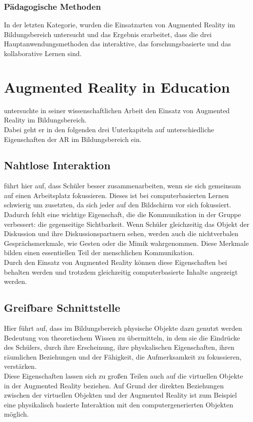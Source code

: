\subsubsection{Pädagogische Methoden}
In der letzten Kategorie, wurden die Einsatzarten von Augmented Reality im Bildungsbereich untersucht und das Ergebnis erarbeitet, dass die drei Hauptanwendungsmethoden das interaktive, das forschungsbasierte und das kollaborative Lernen sind. \citep[S. 82]{hedberg:review-ar-learning}

\section{Augmented Reality in Education}\label{sec:billinghurst-ar-education}
\citeauthor{billinghurst:ar-in-education} untersuchte in seiner wissenschaftlichen Arbeit \citep{billinghurst:ar-in-education} den Einsatz von Augmented Reality im Bildungsbereich.\\
Dabei geht er in den folgenden drei Unterkapiteln auf unterschiedliche Eigenschaften der AR im Bildungsbereich ein.

\subsection{Nahtlose Interaktion}
\citeauthor{billinghurst:ar-in-education} führt hier auf, dass Schüler besser zusammenarbeiten, wenn sie sich gemeinsam auf einen Arbeitsplatz fokussieren. Dieses ist bei computerbasierten Lernen schwierig um zusetzten, da sich jeder auf den Bildschirm vor sich fokussiert. Dadurch fehlt eine wichtige Eigenschaft, die die Kommunikation in der Gruppe verbessert: die gegenseitige Sichtbarkeit. Wenn Schüler gleichzeitig das Objekt der Diskussion und ihre Diskussionspartnern sehen, werden auch die nichtverbalen Gesprächsmerkmale, wie Gesten oder die Mimik wahrgenommen. Diese Merkmale bilden einen essentiellen Teil der menschlichen Kommunikation. \\
Durch den Einsatz von Augmented Reality können diese Eigenschaften bei behalten werden und trotzdem gleichzeitig computerbasierte Inhalte angezeigt werden. \citep[S. 2-3]{billinghurst:ar-in-education}

\subsection{Greifbare Schnittstelle}
Hier führt \citeauthor{billinghurst:ar-in-education} auf, dass im Bildungsbereich physische Objekte dazu genutzt werden Bedeutung von theoretischem Wissen zu übermitteln, in dem sie die Eindrücke des Schülers, durch ihre Erscheinung, ihre physkalischen Eigenschaften, ihren räumlichen Beziehungen und der Fähigkeit, die Aufmerksamkeit zu fokussieren, verstärken.\\
Diese Eigenschaften lassen sich zu großen Teilen auch auf die virtuellen Objekte in der Augmented Reality beziehen. Auf Grund der direkten Beziehungen zwischen der virtuellen Objekten und der Augmented Reality ist zum Beispiel eine physikalisch basierte Interaktion mit den computergenerierten Objekten möglich. \citep[S. 3]{billinghurst:ar-in-education}

